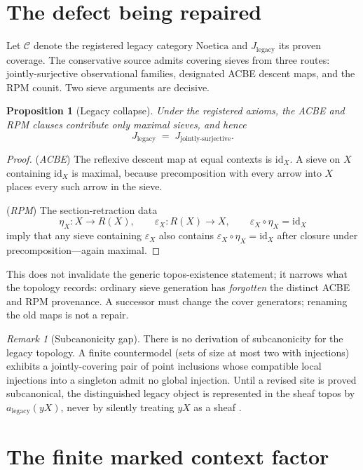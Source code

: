 \documentclass[11pt]{amsart}
\newtheorem{proposition}[theorem]{Proposition}
\theoremstyle{definition}
\theoremstyle{remark}
\newtheorem{remark}[theorem]{Remark}
\newcommand{\id}{\mathrm{id}}
\newcommand{\Noe}{\mathrm{Noetica}}
\newcommand{\Jleg}{J_{\mathrm{legacy}}}
\begin{document}
\section{The defect being repaired}

Let $\mathcal{C}$ denote the registered legacy category $\Noe$ and $\Jleg$ its proven coverage. The conservative source admits covering sieves from three routes: jointly-surjective observational families, designated ACBE descent maps, and the RPM counit. Two sieve arguments are decisive.

\begin{proposition}[Legacy collapse]\label{prop:collapse}
Under the registered axioms, the ACBE and RPM clauses contribute only maximal sieves, and hence
\[
\Jleg \;=\; J_{\text{jointly-surjective}} .
\]
\end{proposition}

\begin{proof}
(\emph{ACBE}) The reflexive descent map at equal contexts is $\id_X$. A sieve on $X$ containing $\id_X$ is maximal, because precomposition with every arrow into $X$ places every such arrow in the sieve.

(\emph{RPM}) The section-retraction data
\[
\eta_X : X \to R(X), \qquad \varepsilon_X : R(X) \to X, \qquad \varepsilon_X \circ \eta_X = \id_X
\]
imply that any sieve containing $\varepsilon_X$ also contains $\varepsilon_X \circ \eta_X = \id_X$ after closure under precomposition---again maximal.
\end{proof}

This does not invalidate the generic topos-existence statement; it narrows what the topology records: ordinary sieve generation has \emph{forgotten} the distinct ACBE and RPM provenance. A successor must change the cover generators; renaming the old maps is not a repair.

\begin{remark}[Subcanonicity gap]\label{rem:subcan}
There is no derivation of subcanonicity for the legacy topology. A finite countermodel (sets of size at most two with injections) exhibits a jointly-covering pair of point inclusions whose compatible local injections into a singleton admit no global injection. Until a revised site is proved subcanonical, the distinguished legacy object is represented in the sheaf topos by $a_{\mathrm{legacy}}(yX)$, never by silently treating $yX$ as a sheaf \cite{stacks00WO}.
\end{remark}

\section{The finite marked context factor}
\end{document}
